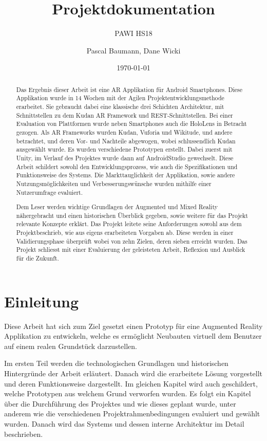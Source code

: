 \documentclass[a4paper]{scrreprt}
\title{Projektdokumentation}
\subtitle{PAWI HS18}
\author{Pascal Baumann, Dane Wicki}
\date{\today}
\begin{document}
\begin{titlepage}
\maketitle
\end{titlepage}

\renewcommand{\abstractname}{Management Summary}
\begin{abstract}
	Das Ergebnis dieser Arbeit ist eine AR Applikation für Android Smartphones. Diese Applikation wurde in 14 Wochen mit der Agilen Projektentwicklungsmethode erarbeitet. Sie gebraucht dabei eine klassische drei Schichten Architektur, mit Schnittstellen zu dem Kudan AR Framework und REST-Schnittstellen. Bei einer Evaluation von Plattformen wurde neben Smartphones auch die HoloLens in Betracht gezogen. Als AR Frameworks wurden Kudan, Vuforia und Wikitude, und andere betrachtet, und deren Vor- und Nachteile abgewogen, wobei schlussendlich Kudan ausgewählt wurde. Es wurden verschiedene Prototypen erstellt. Dabei zuerst mit Unity, im Verlauf des Projektes wurde dann auf AndroidStudio gewechselt. Diese Arbeit schildert sowohl den Entwicklungsprozess, wie auch die Spezifikationen und Funktionsweise des Systems. Die Markttauglichkeit der Applikation, sowie andere Nutzungsmöglichkeiten und Verbesserungswünsche wurden mithilfe einer Nutzerumfrage evaluiert.
	
	Dem Leser werden wichtige Grundlagen der Augmented und Mixed Reality nähergebracht und einen historischen Überblick gegeben, sowie weitere für das Projekt relevante Konzepte erklärt. Das Projekt leitete seine Anforderungen sowohl aus dem Projektbeschrieb, wie aus eigens erarbeiteten Vorgaben ab. Diese werden in einer Validierungsphase überprüft wobei von zehn Zielen, deren sieben erreicht wurden. Das Projekt schliesst mit einer Evaluierung der geleisteten Arbeit, Reflexion und Ausblick für die Zukunft. 
\end{abstract}

\tableofcontents

\clearpage
{}
\chapter{Einleitung}
Diese Arbeit hat sich zum Ziel gesetzt einen Prototyp für eine Augmented Reality Applikation zu entwickeln, welche es ermöglicht Neubauten virtuell dem Benutzer auf einem realen Grundstück darzustellen.

Im ersten Teil werden die technologischen Grundlagen und historischen Hintergründe der Arbeit erläutert. Danach wird die erarbeitete Lösung vorgestellt und deren Funktionsweise dargestellt. Im gleichen Kapitel wird auch geschildert, welche Prototypen aus welchem Grund verworfen wurden. Es folgt ein Kapitel über die Durchführung des Projektes und wie dieses geplant wurde, unter anderem wie die verschiedenen Projektrahmenbedingungen evaluiert und gewählt wurden. Danach wird das Systems und dessen interne Architektur im Detail beschrieben.
\end{document}
